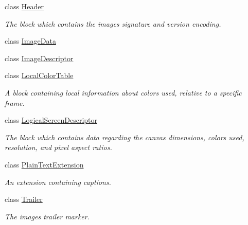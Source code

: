 \begin{DoxyCompactItemize}
class \hyperlink{classvcvj_1_1_models_1_1_grammatical___subcomponents_1_1_header}{Header}
\begin{DoxyCompactList}\small\item\em The block which contains the image\textquotesingle{}s signature and version encoding. \end{DoxyCompactList}\item 
class \hyperlink{classvcvj_1_1_models_1_1_grammatical___subcomponents_1_1_image_data}{Image\+Data}
\item 
class \hyperlink{classvcvj_1_1_models_1_1_grammatical___subcomponents_1_1_image_descriptor}{Image\+Descriptor}
\item 
class \hyperlink{classvcvj_1_1_models_1_1_grammatical___subcomponents_1_1_local_color_table}{Local\+Color\+Table}
\begin{DoxyCompactList}\small\item\em A block containing local information about colors used, relative to a specific frame. \end{DoxyCompactList}\item 
class \hyperlink{classvcvj_1_1_models_1_1_grammatical___subcomponents_1_1_logical_screen_descriptor}{Logical\+Screen\+Descriptor}
\begin{DoxyCompactList}\small\item\em The block which contains data regarding the canvas dimensions, colors used, resolution, and pixel aspect ratios. \end{DoxyCompactList}\item 
class \hyperlink{classvcvj_1_1_models_1_1_grammatical___subcomponents_1_1_plain_text_extension}{Plain\+Text\+Extension}
\begin{DoxyCompactList}\small\item\em An extension containing captions. \end{DoxyCompactList}\item 
class \hyperlink{classvcvj_1_1_models_1_1_grammatical___subcomponents_1_1_trailer}{Trailer}
\begin{DoxyCompactList}\small\item\em The image\textquotesingle{}s trailer marker. \end{DoxyCompactList}\end{DoxyCompactItemize}
